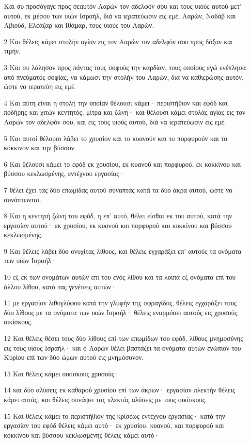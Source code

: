 \par Και συ προσάγαγε προς σεαυτόν Ααρών τον αδελφόν σου και τους υιούς αυτού μετ' αυτού, εκ μέσου των υιών Ισραήλ, διά να ιερατεύωσιν εις εμέ, Ααρών, Ναδάβ και Αβιούδ, Ελεάζαρ και Ιθάμαρ, τους υιούς του Ααρών.
\par 2 Και θέλεις κάμει στολήν αγίαν εις τον Ααρών τον αδελφόν σου προς δόξαν και τιμήν.
\par 3 Και συ λάλησον προς πάντας τους σοφούς την καρδίαν, τους οποίους εγώ ενέπλησα από πνεύματος σοφίας, να κάμωσι την στολήν του Ααρών, διά να καθιερώσης αυτόν, ώστε να ιερατεύη εις εμέ.
\par 4 Και αύτη είναι η στολή την οποίαν θέλουσι κάμει· περιστήθιον και εφόδ και ποδήρης και χιτών κεντητός, μίτρα και ζώνη· και θέλουσι κάμει στολάς αγίας εις τον Ααρών τον αδελφόν σου, και εις τους υιούς αυτού, διά να ιερατεύωσιν εις εμέ.
\par 5 Και αυτοί θέλουσι λάβει το χρυσίον και το κυανούν και το πορφυρούν και το κόκκινον και την βύσσον.
\par 6 Και θέλουσι κάμει το εφόδ εκ χρυσίου, εκ κυανού και πορφυρού, εκ κοκκίνου και βύσσου κεκλωσμένης, εντέχνου εργασίας·
\par 7 θέλει έχει τας δύο επωμίδας αυτού συναπτάς κατά τα δύο άκρα αυτού, ώστε να συνάπτωνται.
\par 8 Και η κεντητή ζώνη του εφόδ, η επ' αυτό, θέλει είσθαι εκ του αυτού, κατά την εργασίαν αυτού· εκ χρυσίου, εκ κυανού και πορφυρού και κοκκίνου και βύσσου κεκλωσμένης.
\par 9 Και θέλεις λάβει δύο ονυχίτας λίθους, και θέλεις εγχαράξει επ' αυτούς τα ονόματα των υιών Ισραήλ·
\par 10 εξ εκ των ονομάτων αυτών επί του ενός λίθου και τα λοιπά εξ ονόματα επί του άλλου λίθου, κατά τας γενέσεις αυτών·
\par 11 με εργασίαν λιθογλύφου κατά την γλυφήν της σφραγίδος, θέλεις εγχαράξει τους δύο λίθους με τα ονόματα των υιών Ισραήλ· θέλεις εναρμόσει αυτούς εις χρυσούς οικίσκους.
\par 12 Και θέλεις θέσει τους δύο λίθους επί των επωμίδων του εφόδ, λίθους μνημοσύνης εις τους υιούς Ισραήλ· και ο Ααρών θέλει βαστάζει τα ονόματα αυτών ενώπιον του Κυρίου επί των δύο ώμων αυτού εις μνημόσυνον.
\par 13 Και θέλεις κάμει οικίσκους χρυσούς·
\par 14 και δύο αλύσεις εκ καθαρού χρυσίου επί των άκρων· εργασίαν πλεκτήν θέλεις κάμει αυτάς, και θέλεις συνάψει τας πλεκτάς αλύσεις με τους οικίσκους.
\par 15 Και θέλεις κάμει το περιστήθιον της κρίσεως εντέχνου εργασίας· κατά την εργασίαν του εφόδ θέλεις κάμει αυτό· εκ χρυσίου, κυανού, και πορφυρού και κοκκίνου και βύσσου κεκλωσμένης θέλεις κάμει αυτό·
